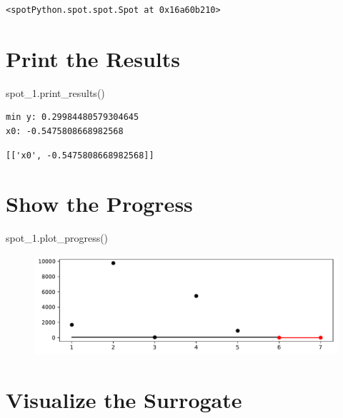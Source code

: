 \documentclass[
  letterpaper,
  DIV=11,
  numbers=noendperiod]{scrreprt}
\newenvironment{Shaded}{\begin{snugshade}}{\end{snugshade}}
\newcommand{\NormalTok}[1]{\textcolor[rgb]{0.00,0.23,0.31}{#1}}
\begin{document}
\begin{verbatim}
<spotPython.spot.spot.Spot at 0x16a60b210>
\end{verbatim}

\hypertarget{print-the-results-5}{%
\section{Print the Results}\label{print-the-results-5}}

\begin{Shaded}
\begin{Highlighting}[]
\NormalTok{spot\_1.print\_results()}
\end{Highlighting}
\end{Shaded}

\begin{verbatim}
min y: 0.29984480579304645
x0: -0.5475808668982568
\end{verbatim}

\begin{verbatim}
[['x0', -0.5475808668982568]]
\end{verbatim}

\hypertarget{show-the-progress-2}{%
\section{Show the Progress}\label{show-the-progress-2}}

\begin{Shaded}
\begin{Highlighting}[]
\NormalTok{spot\_1.plot\_progress()}
\end{Highlighting}
\end{Shaded}

\begin{figure}[H]

{\centering \includegraphics{a_04_spot_doc_files/figure-pdf/cell-8-output-1.pdf}

}

\end{figure}

\hypertarget{visualize-the-surrogate}{%
\section{Visualize the Surrogate}\label{visualize-the-surrogate}}
\end{document}
